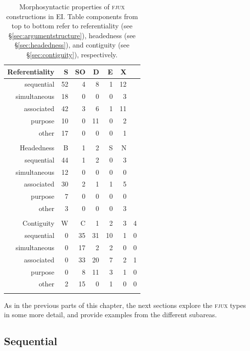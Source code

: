 \begin{table}
\centering
\begin{tabular}{rrrrrrr}
  \lsptoprule
Referentiality & S & SO & D & E & X \\ 
  \midrule
  sequential &  52 &   4 &   8 &   1 &  12 \\ 
  simultaneous &  18 &   0 &   0 &   0 &   3 \\ 
  associated &  42 &   3 &   6 &   1 &  11 \\ 
  purpose &  10 &   0 &  11 &   0 &   2 \\ 
  other &  17 &   0 &   0 &   0 &   1 \\ 
   \midrule
 \\
  \midrule
Headedness & B & 1 & 2 & S & N \\ 
  \midrule
  sequential &  44 &   1 &   2 &   0 &   3 \\ 
  simultaneous &  12 &   0 &   0 &   0 &   0 \\ 
  associated &  30 &   2 &   1 &   1 &   5 \\ 
  purpose &   7 &   0 &   0 &   0 &   0 \\ 
  other &   3 &   0 &   0 &   0 &   3 \\ 
   \midrule
 \\
  \midrule
Contiguity & W & C & 1 & 2 & 3 & 4 \\ 
  \midrule
  sequential &   0 &  35 &  31 &  10 &   1 &   0 \\ 
  simultaneous &   0 &  17 &   2 &   2 &   0 &   0 \\ 
  associated &   0 &  33 &  20 &   7 &   2 &   1 \\ 
  purpose &   0 &   8 &  11 &   3 &   1 &   0 \\ 
  other &   2 &  15 &   0 &   1 &   0 &   0 \\ 
   \lspbottomrule
\end{tabular}
\caption[Morphosyntactic properties of \textsc{fjux} constructions]{Morphosyntactic properties of \textsc{fjux} constructions in EI. Table components from top to bottom refer to referentiality (see §\ref{sec:argumentstructure}), headedness (see §\ref{sec:headedness}), and contiguity (see §\ref{sec:contiguity}), respectively.}
\label{table:FJUX_formal}
\end{table}

As in the previous parts of this chapter, the next sections explore the \textsc{fjux} types in some more detail, and provide examples from the different subareas.

\subsection{Sequential}

